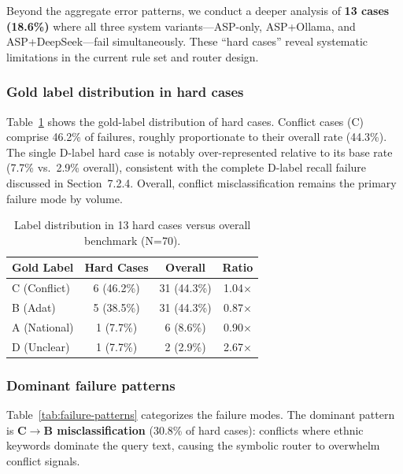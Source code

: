 \documentclass[11pt]{article}
\begin{document}
Beyond the aggregate error patterns, we conduct a deeper analysis of \textbf{13 cases (18.6\%)} where all three system variants---ASP-only, ASP+Ollama, and ASP+DeepSeek---fail simultaneously. These ``hard cases'' reveal systematic limitations in the current rule set and router design.

\subsubsection{Gold label distribution in hard cases}

Table~\ref{tab:hardcases-dist} shows the gold-label distribution of hard cases. Conflict cases (C) comprise 46.2\% of failures, roughly proportionate to their overall rate (44.3\%). The single D-label hard case is notably over-represented relative to its base rate (7.7\% vs.\ 2.9\% overall), consistent with the complete D-label recall failure discussed in Section~7.2.4. Overall, conflict misclassification remains the primary failure mode by volume.

\begin{table}[h]
\centering
\begin{tabular}{lccc}
\toprule
Gold Label & Hard Cases & Overall & Ratio \\
\midrule
C (Conflict) & 6 (46.2\%) & 31 (44.3\%) & 1.04$\times$ \\
B (Adat) & 5 (38.5\%) & 31 (44.3\%) & 0.87$\times$ \\
A (National) & 1 (7.7\%) & 6 (8.6\%) & 0.90$\times$ \\
D (Unclear) & 1 (7.7\%) & 2 (2.9\%) & 2.67$\times$ \\
\bottomrule
\end{tabular}
\caption{Label distribution in 13 hard cases versus overall benchmark (N=70).}
\label{tab:hardcases-dist}
\end{table}

\subsubsection{Dominant failure patterns}

Table~\ref{tab:failure-patterns} categorizes the failure modes. The dominant pattern is \textbf{C$\rightarrow$B misclassification} (30.8\% of hard cases): conflicts where ethnic keywords dominate the query text, causing the symbolic router to overwhelm conflict signals.
\end{document}
